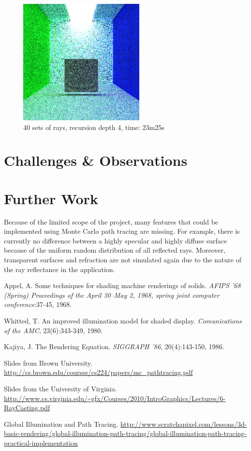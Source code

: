 \documentclass[journal]{IEEEtran}
\begin{document}
\begin{figure}[!t]

\centering
\includegraphics[width=2.5in]{40s_4d_23m25s}
\caption{40 sets of rays, recursion depth 4, time: 23m25s}
\label{40s_4d_23m25s}

\end{figure}

\section{Challenges \& Observations}

\section{Further Work}
Because of the limited scope of the project, many features that could be implemented using Monte Carlo path tracing are missing. For example, there is currently no difference between a highly specular and highly diffuse surface because of the uniform random distribution of all reflected rays. Moreover, transparent surfaces and refraction are not simulated again due to the nature of the ray reflectance in the application.


\begin{thebibliography}{5}

Appel, A. Some techniques for shading machine renderings of solids. \emph{AFIPS '68 (Spring) Proceedings of the April 30--May 2, 1968, spring joint computer conference}:37-45, 1968.

Whitted, T. An improved illumination model for shaded display. \emph{Comunications of the AMC}, 23(6):343-349, 1980.

Kajiya, J. The Rendering Equation. \emph{SIGGRAPH '86}, 20(4):143-150, 1986.

Slides from Brown University.
\url{http://cs.brown.edu/courses/cs224/papers/mc_pathtracing.pdf}

Slides from the University of Virginia.
\url{http://www.cs.virginia.edu/~gfx/Courses/2010/IntroGraphics/Lectures/6-RayCasting.pdf}

Global Illumination and Path Tracing.
\url{http://www.scratchapixel.com/lessons/3d-basic-rendering/global-illumination-path-tracing/global-illumination-path-tracing-practical-implementation}

\end{thebibliography}

\end{document}
